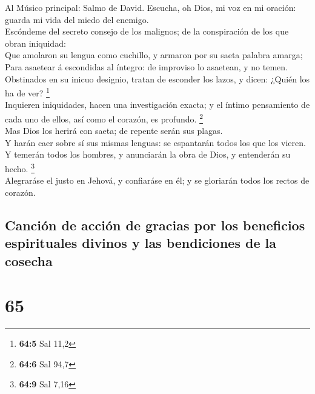  Al Músico principal: Salmo de David. Escucha, oh Dios, mi
voz en mi oración: guarda mi vida del miedo del enemigo.\\
 Escóndeme del secreto consejo de los malignos; de la
conspiración de los que obran iniquidad:\\
 Que amolaron su lengua como cuchillo, y armaron por su
saeta palabra amarga;\\
 Para asaetear á escondidas al íntegro: de improviso lo
asaetean, y no temen.\\
 Obstinados en su inicuo designio, tratan de esconder los
lazos, y dicen: ¿Quién los ha de ver? \footnote{\textbf{64:5} Sal 11,2}\\
 Inquieren iniquidades, hacen una investigación exacta; y el
íntimo pensamiento de cada uno de ellos, así como el corazón, es
profundo. \footnote{\textbf{64:6} Sal 94,7}\\
 Mas Dios los herirá con saeta; de repente serán sus
plagas.\\
 Y harán caer sobre sí sus mismas lenguas: se espantarán
todos los que los vieren.\\
 Y temerán todos los hombres, y anunciarán la obra de Dios,
y entenderán su hecho. \footnote{\textbf{64:9} Sal 7,16}\\
 Alegraráse el justo en Jehová, y confiaráse en él; y se
gloriarán todos los rectos de corazón.

\hypertarget{canciuxf3n-de-acciuxf3n-de-gracias-por-los-beneficios-espirituales-divinos-y-las-bendiciones-de-la-cosecha}{%
\subsection{Canción de acción de gracias por los beneficios espirituales
divinos y las bendiciones de la
cosecha}\label{canciuxf3n-de-acciuxf3n-de-gracias-por-los-beneficios-espirituales-divinos-y-las-bendiciones-de-la-cosecha}}

\hypertarget{section-64}{%
\section{65}\label{section-64}}

